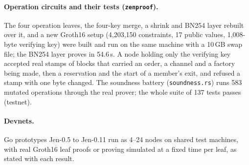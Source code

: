 \paragraph{Operation circuits and their tests (\texttt{zenproof}).} The four operation leaves, the four-key merge, a shrink and BN254 layer rebuilt over it, and a new Groth16 setup (4,203,150 constraints, 17 public values, 1,008-byte verifying key) were built and run on the same machine with a 10\,GB swap file; the BN254 layer proves in 54.6\,s. A node holding only the verifying key accepted real stamps of blocks that carried an order, a channel and a factory being made, then a reservation and the start of a member's exit, and refused a stamp with one byte changed. The soundness battery (\texttt{soundness.rs}) runs 583 mutated operations through the real prover; the whole suite of 137 tests passes (testnet).

\paragraph{Devnets.} Go prototypes Jen-0.5 to Jen-0.11 run as 4--24 nodes on shared test machines, with real Groth16 leaf proofs or proving simulated at a fixed time per leaf, as stated with each result.

